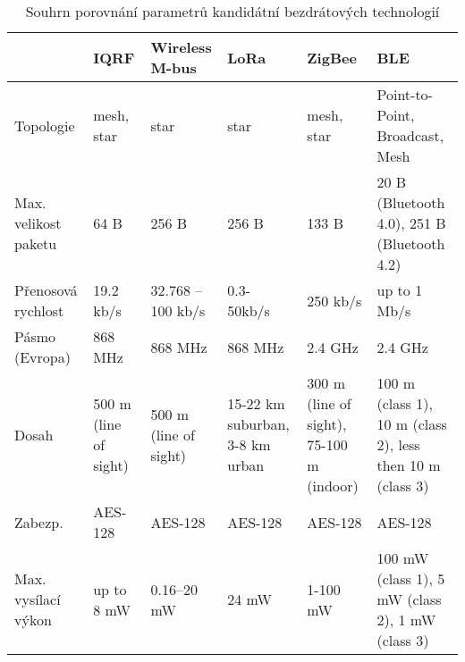 \DIFdelbegin %

\DIFdelend \begin{table}[!h]
  \centering
  \begin{ctucolortab}    
  \begin{tabular}{|p{1.5cm}||p{1.5cm}|p{1.5cm}|p{1.5cm}|p{1.5cm}|p{2.5cm}|}
      \hline
                           & \textbf{IQRF}         & \textbf{Wireless M-bus} & \textbf{LoRa}                 & \textbf{ZigBee}                          & \textbf{BLE}                                              \\ \hline \hline
    Topologie               & mesh, star            & star                  & star                            & mesh, star                               & Point-to-Point, Broadcast, Mesh                           \\ \hline
    Max. velikost paketu & 64 B                  & 256 B                 & 256 B                           & 133 B                                    & 20 B (Bluetooth 4.0), 251 B (Bluetooth 4.2)               \\ \hline
    Přenosová rychlost              & 19.2 kb/s             & 32.768 – 100 kb/s     & 0.3-50kb/s                      & 250 kb/s                                 & up to 1 Mb/s                                              \\ \hline
    Pásmo (Evropa)          & 868 MHz               & 868 MHz               & 868 MHz                         & 2.4 GHz                                  & 2.4 GHz                                                   \\ \hline
    Dosah                  & 500 m (line of sight) & 500 m (line of sight) & 15-22 km suburban, 3-8 km urban & 300 m (line of sight), 75-100 m (indoor) & 100 m (class 1), 10 m (class 2), less then 10 m (class 3) \\ \hline
    Zabezp.               & AES-128               & AES-128               & AES-128                         & AES-128                                  & AES-128                                                   \\ \hline
    Max. vysílací výkon & up to 8 mW            & 0.16–20 mW            & 24 mW                           & 1-100 mW                                 & 100 mW (class 1), 5 mW (class 2), 1 mW (class 3)          \\ \hline
  \end{tabular}
  \end{ctucolortab}
  \caption{Souhrn porovnání parametrů kandidátní bezdrátových technologií}
  \label{table:shrnutiTechnologii}
\end{table}


